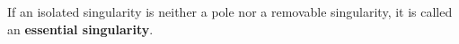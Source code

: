 If an isolated singularity is neither a pole nor a removable singularity, it is called an \textbf{essential singularity}.
